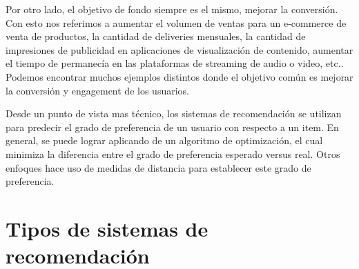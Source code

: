 \documentclass[11pt,a4paper,twoside]{tesis}
\begin{document}
Por otro lado, el objetivo de fondo siempre es el mismo, mejorar la conversión. Con esto nos referimos a aumentar el volumen de ventas para un e-commerce de venta de productos, la cantidad de deliveries mensuales, la cantidad de impresiones de publicidad  en aplicaciones de visualización de contenido, aumentar el tiempo de permanecía en las plataformas de streaming de audio o video, etc.. Podemos encontrar muchos ejemplos distintos donde el objetivo común es mejorar la conversión y engagement de los usuarios.

Desde un punto de vista mas técnico, los sistemas de recomendación se utilizan para predecir el grado de preferencia de un usuario con respecto a un item. 
En general, se puede lograr aplicando de un algoritmo de optimización, el cual minimiza la diferencia entre el grado de preferencia esperado versus real. Otros enfoques hace uso de medidas de distancia para establecer este grado de preferencia.

\section{Tipos de sistemas de recomendación}
\end{document}
